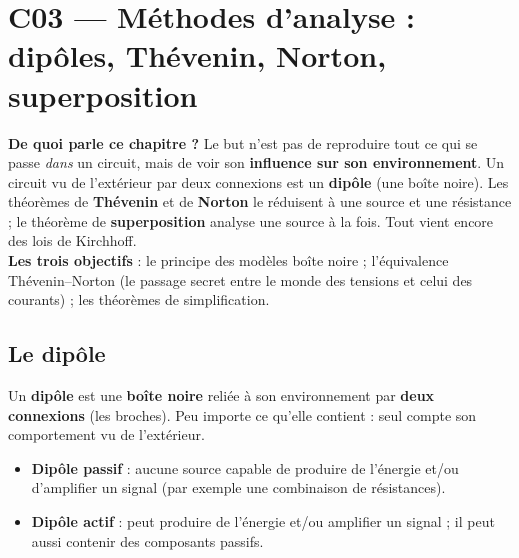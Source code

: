 \chapter{C03 --- Méthodes d'analyse : dipôles, Thévenin, Norton, superposition}

\begin{rembox}[title=En bref]
\textbf{De quoi parle ce chapitre ?} Le but n'est pas de reproduire tout ce qui se passe
\emph{dans} un circuit, mais de voir son \textbf{influence sur son environnement}. Un circuit
vu de l'extérieur par deux connexions est un \textbf{dipôle} (une boîte noire). Les théorèmes
de \textbf{Thévenin} et de \textbf{Norton} le réduisent à une source et une résistance ; le
théorème de \textbf{superposition} analyse une source à la fois. Tout vient encore des lois
de Kirchhoff. \\
\textbf{Les trois objectifs} : le principe des modèles \og boîte noire\fg{} ; l'équivalence
Thévenin--Norton (\og le passage secret entre le monde des tensions et celui des
courants\fg{}) ; les théorèmes de simplification.
\end{rembox}

\section{Le dipôle}


\begin{defnbox}[title={Dipôle, passif ou actif}]
Un \textbf{dipôle} est une \textbf{boîte noire} reliée à son environnement par \textbf{deux
connexions} (les \og broches\fg{}). Peu importe ce qu'elle contient : seul compte son
comportement vu de l'extérieur.
\begin{itemize}
  \item \textbf{Dipôle passif} : aucune source capable de produire de l'énergie et/ou
        d'amplifier un signal (par exemple une combinaison de résistances).
  \item \textbf{Dipôle actif} : peut produire de l'énergie et/ou amplifier un signal ; il
        peut aussi contenir des composants passifs.
\end{itemize}
\end{defnbox}

